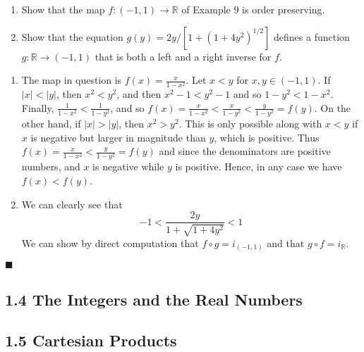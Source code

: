 \documentclass[12pt]{article}
\renewcommand{\qed}{\hfill$\blacksquare$}
\renewenvironment{proof}{\begin{addmargin}[1em]{0em}\begin{newproof}}{\end{newproof}\end{addmargin}\qed}
\newenvironment{problem}[2][Exercise]{\begin{trivlist}
\item[\hskip \labelsep {\bfseries #1}\hskip \labelsep {\bfseries #2.}]}{\end{trivlist}}
\begin{document}
\begin{problem}{1.3.10}
\begin{enumerate}[label=(\alph*)]
	\item Show that the map $f:\left(-1,1\right)\rightarrow \mathbb{R}$ of Example 9 is order preserving.
	\item Show that the equation $g\left(y\right) = 2y/\left[1+\left(1+4y^2\right)^{1/2}\right]$ defines a function $g:\mathbb{R}\rightarrow \left(-1,1\right)$ that is both a left and a right inverse for $f$.
\end{enumerate}
\end{problem}
\begin{proof}
\begin{enumerate}[label=(\alph*)]
	\item The map in question is $f\left(x\right) = \frac{x}{1-x^2}$. Let $x < y$ for $x,y \in \left(-1,1\right)$. If $\left|x\right| < \left|y\right|$, then $x^2 < y^2$, and then $x^2-1 < y^2 -1$ and so $1-y^2 < 1-x^2$. Finally, $\frac{1}{1-x^2} < \frac{1}{1-y^2}$, and so $f\left(x\right) = \frac{x}{1-x^2} < \frac{x}{1-y^2} < \frac{y}{1-y^2} = f\left(y\right)$. On the other hand, if $\left|x\right| > \left|y\right|$, then $x^2 > y^2$. This is only possible along with $x<y$ if $x$ is negative but larger in magnitude than $y$, which is positive. Thus $f\left(x\right) =\frac{x}{1-x^2} < \frac{y}{1-y^2} = f\left(y\right)$ and since the denominators are positive numbers, and $x$ is negative while $y$ is positive. Hence, in any case we have $f\left(x\right) < f\left(y\right)$.
	
	\item We can clearly see that \[ -1 < \frac{2y}{1+\sqrt{1+4y^2}} < 1 \] We can show by direct computation that $f\circ g = i_{\left(-1,1\right)}$ and that $g \circ f = i_{\mathbb{R}}$.
\end{enumerate}
\end{proof}













\subsection*{1.4 The Integers and the Real Numbers}



\subsection*{1.5 Cartesian Products}
\end{document}
